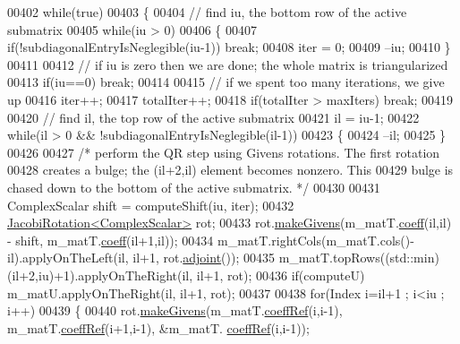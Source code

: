 \begin{DoxyCode}
00402   \textcolor{keywordflow}{while}(\textcolor{keyword}{true})
00403   \{
00404     \textcolor{comment}{// find iu, the bottom row of the active submatrix}
00405     \textcolor{keywordflow}{while}(iu > 0)
00406     \{
00407       \textcolor{keywordflow}{if}(!subdiagonalEntryIsNeglegible(iu-1)) \textcolor{keywordflow}{break};
00408       iter = 0;
00409       --iu;
00410     \}
00411 
00412     \textcolor{comment}{// if iu is zero then we are done; the whole matrix is triangularized}
00413     \textcolor{keywordflow}{if}(iu==0) \textcolor{keywordflow}{break};
00414 
00415     \textcolor{comment}{// if we spent too many iterations, we give up}
00416     iter++;
00417     totalIter++;
00418     \textcolor{keywordflow}{if}(totalIter > maxIters) \textcolor{keywordflow}{break};
00419 
00420     \textcolor{comment}{// find il, the top row of the active submatrix}
00421     il = iu-1;
00422     \textcolor{keywordflow}{while}(il > 0 && !subdiagonalEntryIsNeglegible(il-1))
00423     \{
00424       --il;
00425     \}
00426 
00427     \textcolor{comment}{/* perform the QR step using Givens rotations. The first rotation}
00428 \textcolor{comment}{       creates a bulge; the (il+2,il) element becomes nonzero. This}
00429 \textcolor{comment}{       bulge is chased down to the bottom of the active submatrix. */}
00430 
00431     ComplexScalar shift = computeShift(iu, iter);
00432     \hyperlink{group___jacobi___module_class_eigen_1_1_jacobi_rotation}{JacobiRotation<ComplexScalar>} rot;
00433     rot.\hyperlink{group___jacobi___module_af73c81e9cc139b7e0d877ce553b02ec0}{makeGivens}(m\_matT.\hyperlink{class_eigen_1_1_plain_object_base_afbfc12954f16d21aedb7bd839f64a278}{coeff}(il,il) - shift, m\_matT.\hyperlink{class_eigen_1_1_plain_object_base_afbfc12954f16d21aedb7bd839f64a278}{coeff}(il+1,il));
00434     m\_matT.rightCols(m\_matT.cols()-il).applyOnTheLeft(il, il+1, rot.\hyperlink{group___jacobi___module_a89c8ea615f8fa77ddd5810a1e5fde4da}{adjoint}());
00435     m\_matT.topRows((std::min)(il+2,iu)+1).applyOnTheRight(il, il+1, rot);
00436     \textcolor{keywordflow}{if}(computeU) m\_matU.applyOnTheRight(il, il+1, rot);
00437 
00438     \textcolor{keywordflow}{for}(Index i=il+1 ; i<iu ; i++)
00439     \{
00440       rot.\hyperlink{group___jacobi___module_af73c81e9cc139b7e0d877ce553b02ec0}{makeGivens}(m\_matT.\hyperlink{class_eigen_1_1_plain_object_base_a25626a55b26a4323565f79d1b7c48ea8}{coeffRef}(i,i-1), m\_matT.\hyperlink{class_eigen_1_1_plain_object_base_a25626a55b26a4323565f79d1b7c48ea8}{coeffRef}(i+1,i-1), &m\_matT.
      \hyperlink{class_eigen_1_1_plain_object_base_a25626a55b26a4323565f79d1b7c48ea8}{coeffRef}(i,i-1));

\end{DoxyCode}
